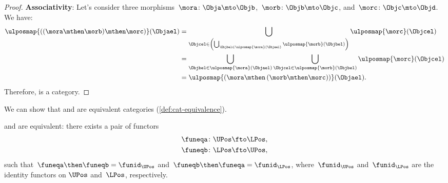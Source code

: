 \begin{proof}
	\textbf{Associativity}:
	Let's consider three morphisms~$\mora\colon \Obja \mto \Objb$,~$\morb\colon \Objb\mto \Objc$, and~$\morc\colon \Objc\mto \Objd$.
	We have:
	\begin{equation*}
		\begin{aligned}
			\ulposmap{\left( (\mora \mthen \morb) \mthen \morc\right)}(\Objael) & =
			\bigcup_{\Objcel \in \left( \bigcup_{\Objbel \in \ulposmap{\mora}(\Objael)}\ulposmap{\morb}(\Objbel)\right)}\ulposmap{\morc}(\Objcel)                                                        \\
			                                                                    & =\bigcup_{\Objbel\in \ulposmap{\mora}(\Objael)}\bigcup_{\Objcel\in \ulposmap{\morb}(\Objbel)}\ulposmap{\morc}(\Objcel) \\
			                                                                    & =\ulposmap{\left( \mora \mthen \left( \morb\mthen \morc\right)\right)}(\Objael).
		\end{aligned}
	\end{equation*}
	Therefore, \UPos is a category.
\end{proof}

We can show that \UPos and \LPos are equivalent categories (\cref{def:cat-equivalence}).

\begin{lemma}
	\label{lem:ulposequiv}
	\UPos and \LPos are equivalent: there exists a pair of functors
	\begin{equation}
		\begin{aligned}
			\funeqa\colon \UPos & \fto \LPos, \\
			\funeqb\colon \LPos & \fto \UPos,
		\end{aligned}
	\end{equation}
	such that~$\funeqa \then \funeqb=\funid_{\UPos}$ and~$\funeqb \then \funeqa=\funid_{\LPos}$, where~$\funid_{\UPos}$ and~$\funid_{\LPos}$ are the identity functors on $\UPos$ and~$\LPos$, respectively.
\end{lemma}

